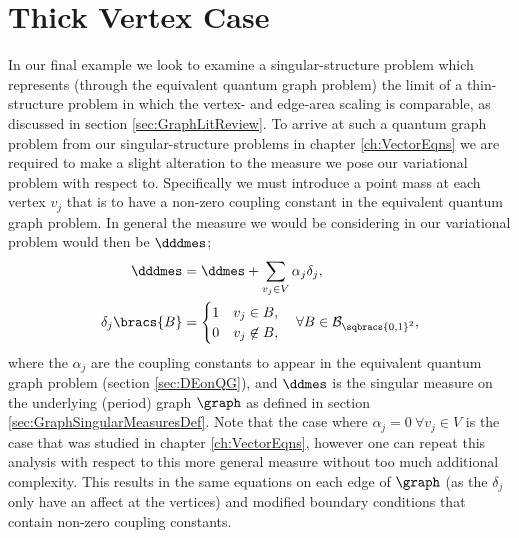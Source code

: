 \section{Thick Vertex Case} \label{sec:ExampleThickVertex}
In our final example we look to examine a singular-structure problem which represents (through the equivalent quantum graph problem) the limit of a thin-structure problem in which the vertex- and edge-area scaling is comparable, as discussed in section \ref{sec:GraphLitReview}.
To arrive at such a quantum graph problem from our singular-structure problems in chapter \ref{ch:VectorEqns} we are required to make a slight alteration to the measure we pose our variational problem with respect to.
Specifically we must introduce a point mass at each vertex $v_j$ that is to have a non-zero coupling constant in the equivalent quantum graph problem. 
In general the measure we would be considering in our variational problem would then be $\dddmes$;
\begin{align*}
	\dddmes &= \ddmes + \sum_{v_j\in V}\alpha_j \delta_{j}, \\
	\delta_{j}\bracs{B} &= \begin{cases} 1 & v_j\in B, \\ 0 & v_j\not\in B, \end{cases} \quad\forall B\in\mathcal{B}_{\sqbracs{0,1}^2},
\end{align*}
where the $\alpha_j$ are the coupling constants to appear in the equivalent quantum graph problem (section \ref{sec:DEonQG}), and $\ddmes$ is the singular measure on the underlying (period) graph $\graph$ as defined in section \ref{sec:GraphSingularMeasuresDef}.
Note that the case where $\alpha_j=0 \ \forall v_j\in V$ is the case that was studied in chapter \ref{ch:VectorEqns}, however one can repeat this analysis with respect to this more general measure without too much additional complexity.
This results in the same equations on each edge of $\graph$ (as the $\delta_j$ only have an affect at the vertices) and modified boundary conditions that contain non-zero coupling constants. \newline

